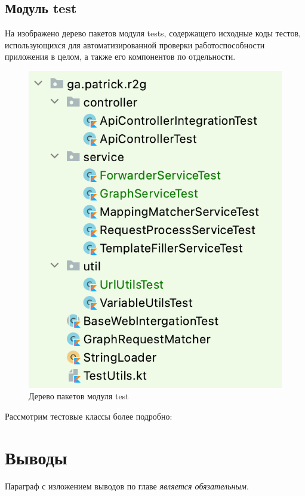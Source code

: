 \subsection{Модуль test}\label{subsec:module-test}

На  изображено дерево пакетов модуля tests, содержащего исходные коды тестов, использующихся для автоматизированной проверки работоспособности приложения в целом, а также его компонентов по отдельности.

\begin{figure}[ht!]
	\center
	\includegraphics [scale=0.6] {my_folder/images/ch3-tests}
	\caption{Дерево пакетов модуля test}
	\label{fig:ch3-tests}
\end{figure}

Рассмотрим тестовые классы более подробно: %





\section{Выводы} \label{sec:ch3-conclusion}

Параграф с изложением выводов по главе \textit{является обязательным}.